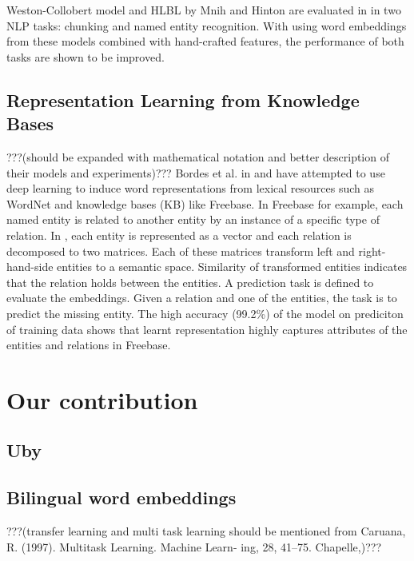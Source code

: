 \documentclass[preprint,12pt]{elsarticle}
\begin{document}
Weston-Collobert model and HLBL by Mnih and Hinton are evaluated in
\cite{Turian2010b} in two NLP tasks: chunking and named entity recognition. With
using word embeddings from these models combined with hand-crafted features, the
performance of both tasks are shown to be improved.

\subsection{Representation Learning from Knowledge Bases}
\label{rel-work:structured-embedding}
???(should be expanded with mathematical notation and better description of their models and experiments)???
Bordes et al. in \cite{Bordes2011} and \cite{Bordes2012} have attempted to use
deep learning to induce word representations from lexical resources such as
WordNet and knowledge bases (KB) like Freebase. In Freebase for example, each named entity is related
to another entity by an instance of a specific type of relation. In
\cite{Bordes2011}, each entity is represented as a vector and each relation is decomposed to two
matrices. Each of these matrices transform left and right-hand-side entities
to a semantic space. Similarity of transformed entities indicates that the
relation holds between the entities.  A prediction task is defined to evaluate
the embeddings. Given a relation and one of the entities, the task is to predict
the missing entity. The high accuracy (99.2\%) of the model on prediciton
of training data shows that learnt representation highly captures attributes of
the entities and relations in Freebase.

\section {Our contribution}
\label{sec:contr}



\subsection{Uby}
\label{contr:uby}

\subsection{Bilingual word embeddings}
\label{contr:bilingual}
???(transfer learning and multi task learning should be mentioned from Caruana, R. 
(1997). Multitask Learning. Machine Learn- ing, 28, 41–75.
Chapelle,)???
\end{document}
